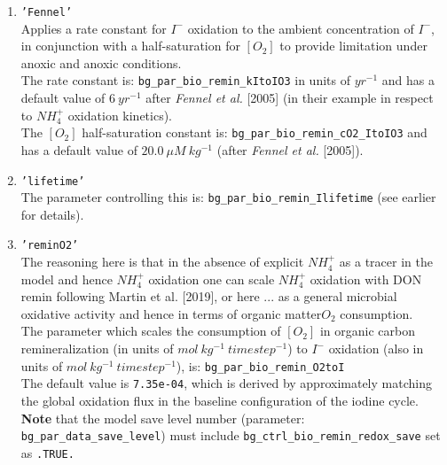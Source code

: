 \begin{itemize}[noitemsep]
\begin{enumerate}[noitemsep]

\vspace{1mm}
\item \texttt{'Fennel'}
\vspace{1mm}
\\Applies a rate constant for \(I^{-}\) oxidation to the ambient concentration of \(I^{-}\), in conjunction with a half-saturation for \([O_{2}]\) to provide limitation under anoxic and anoxic conditions.
\\The rate constant is: \texttt{bg\_par\_bio\_remin\_kItoIO3} in units of \(yr^{-1}\) and has a default value of \(6\:yr^{-1}\) after \textit{Fennel et al.} [2005] (in their example in respect to \(NH^{+}_{4}\) oxidation kinetics).
\\The \([O_{2}]\) half-saturation constant is: \texttt{bg\_par\_bio\_remin\_cO2\_ItoIO3} and has a default value of \(20.0\: \mu M \: kg^{-1}\) (after \textit{Fennel et al.} [2005]).
 
\vspace{1mm}
\item \texttt{'lifetime'}
\vspace{1mm}
\\The parameter controlling this is: \texttt{bg\_par\_bio\_remin\_Ilifetime} (see earlier for details).

\vspace{1mm}
\item \texttt{'reminO2'}
\vspace{1mm}
\\The reasoning here is that in the absence of explicit \(NH^{+}_{4}\) as a tracer in the model and hence \(NH^{+}_{4}\) oxidation one can scale \(NH^{+}_{4}\) oxidation with DON remin following Martin et al. [2019], or here ... as a general microbial oxidative activity and hence in terms of organic matter\(O_{2}\) consumption.
\vspace{1mm}
\\The parameter which scales the consumption of \([O_{2}]\) in organic carbon remineralization (in units of \(mol\:kg^{-1}\:timestep^{-1}\)) to \(I^{-}\) oxidation (also in units of \(mol\:kg^{-1}\:timestep^{-1}\)), is: \texttt{bg\_par\_bio\_remin\_O2toI}
\vspace{1mm}
\\The default value is \texttt{7.35e-04}, which is derived by approximately matching the global oxidation flux in the baseline configuration of the iodine cycle.
\vspace{1mm}
\\\textbf{Note} that the model save level number (parameter: \texttt{bg\_par\_data\_save\_level}) must include \texttt{bg\_ctrl\_bio\_remin\_redox\_save} set as \texttt{.TRUE.}


\end{enumerate}
\end{itemize}
